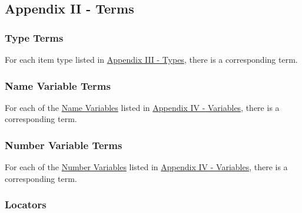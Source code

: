 \hypertarget{appendix-ii---terms}{%
\subsection{Appendix II - Terms}\label{appendix-ii---terms}}

\hypertarget{type-terms}{%
\subsubsection{Type Terms}\label{type-terms}}

For each item type listed in
\protect\hyperlink{appendix-iii---types}{Appendix III - Types}, there is
a corresponding term.

\hypertarget{name-variable-terms}{%
\subsubsection{Name Variable Terms}\label{name-variable-terms}}

For each of the \protect\hyperlink{name-variables}{Name Variables}
listed in \protect\hyperlink{appendix-iv---variables}{Appendix IV -
Variables}, there is a corresponding term.

\hypertarget{number-variable-terms}{%
\subsubsection{Number Variable Terms}\label{number-variable-terms}}

For each of the \protect\hyperlink{number-variables}{Number Variables}
listed in \protect\hyperlink{appendix-iv---variables}{Appendix IV -
Variables}, there is a corresponding term.

\hypertarget{locators}{%
\subsubsection{Locators}\label{locators}}

